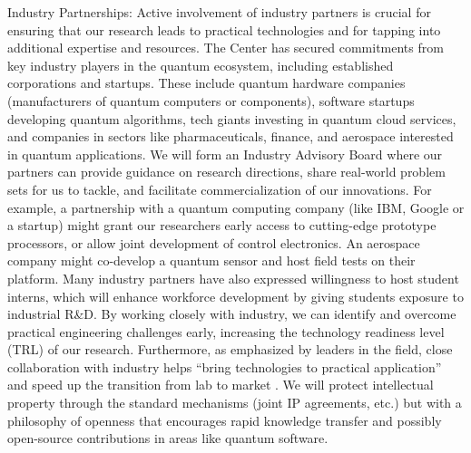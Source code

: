 \documentclass[12pt]{article}
\begin{document}
Industry Partnerships: Active involvement of industry partners is crucial for ensuring that our research leads to practical technologies and for tapping into additional expertise and resources. The Center has secured commitments from key industry players in the quantum ecosystem, including established corporations and startups. These include quantum hardware companies (manufacturers of quantum computers or components), software startups developing quantum algorithms, tech giants investing in quantum cloud services, and companies in sectors like pharmaceuticals, finance, and aerospace interested in quantum applications. We will form an Industry Advisory Board where our partners can provide guidance on research directions, share real-world problem sets for us to tackle, and facilitate commercialization of our innovations. For example, a partnership with a quantum computing company (like IBM, Google or a startup) might grant our researchers early access to cutting-edge prototype processors, or allow joint development of control electronics. An aerospace company might co-develop a quantum sensor and host field tests on their platform. Many industry partners have also expressed willingness to host student interns, which will enhance workforce development by giving students exposure to industrial R&D. By working closely with industry, we can identify and overcome practical engineering challenges early, increasing the technology readiness level (TRL) of our research. Furthermore, as emphasized by leaders in the field, close collaboration with industry helps “bring technologies to practical application” and speed up the transition from lab to market . We will protect intellectual property through the standard mechanisms (joint IP agreements, etc.) but with a philosophy of openness that encourages rapid knowledge transfer and possibly open-source contributions in areas like quantum software.
\end{document}
